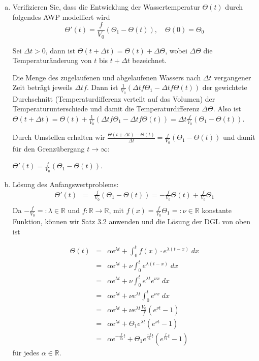 \documentclass[11pt,a4paper,ngerman]{article}
\begin{document}
\begin{enumerate}[a)]
\item Verifizieren Sie, dass die Entwicklung der Wassertemperatur $\Theta(t)$ durch folgendes AWP modelliert wird
$$ \Theta'(t) = \frac{f}{V_0}(\Theta_1 - \Theta(t)), \quad \Theta(0) = \Theta_0$$ 

Sei $\Delta t > 0$, dann ist $\Theta(t + \Delta t) = \Theta(t) + \Delta \Theta$, wobei $\Delta \Theta$ die Temperaturänderung von $t$ bis $t + \Delta t$ bezeichnet.

Die Menge des zugelaufenen und abgelaufenen Wassers nach $\Delta t$ vergangener Zeit beträgt jeweils $\Delta t f$. Dann ist $\frac{1}{V_0}(\Delta t f \Theta_1 - \Delta t f \Theta(t))$ der gewichtete Durchschnitt (Temperaturdifferenz verteilt auf das Volumen) der Temperaturunterschiede und damit die Temperaturdifferenz $\Delta \Theta$. Also ist $\Theta(t + \Delta t) = \Theta(t) + \frac{1}{V_0}(\Delta t f \Theta_1 - \Delta t f \Theta(t)) = \Delta t \frac{f}{V_0} (\Theta_1 - \Theta(t))$.

Durch Umstellen erhalten wir $\frac{\Theta(t + \Delta t) - \Theta(t)}{\Delta t} = \frac{f}{V_0} (\Theta_1 - \Theta(t))$ und damit für den Grenzübergang $t \to \infty$:

$\Theta'(t) = \frac{f}{V_0} (\Theta_1 - \Theta(t))$.

\item Lösung des Anfangswertproblems:
\begin{eqnarray*}
\Theta'(t) &=& \frac{f}{V_0} (\Theta_1 - \Theta(t)) = -\frac{f}{V_0} \Theta(t) + \frac{f}{V_0}\Theta_1 \\ 
\end{eqnarray*}
Da $-\frac{f}{V_0} =: \lambda \in \mathbb{R}$ und $f : \mathbb{R} \to \mathbb{R}$, mit $f(x)= \frac{f}{V_0}\Theta_1 =: \nu \in \mathbb{R}$ konstante Funktion, können wir Satz 3.2 anwenden und die Lösung der DGL von oben ist

\begin{eqnarray*}
\Theta(t) &=& \alpha e^{\lambda t} + \int_0^t f(x) \cdot e^{\lambda(t-x)} \; dx \\
&=& \alpha e^{\lambda t} + \nu \int_0^t e^{\lambda(t-x)} \; dx \\
&=& \alpha e^{\lambda t} + \nu \int_0^t  e^{\lambda t} e^{\nu x} \; dx \\
&=& \alpha e^{\lambda t} + \nu e^{\lambda t} \int_0^t  e^{\nu x} \; dx \\
&=& \alpha e^{\lambda t} + \nu e^{\lambda t} \frac{V_0}{f} (e^{\nu t} - 1) \\
&=& \alpha e^{\lambda t} + \Theta_1  e^{\lambda t} (e^{\nu t} - 1) \\
&=& \alpha e^{-\frac{f}{V_0} t} + \Theta_1  e^{\frac{-f}{V_0} t} (e^{\frac{f}{V_0} t} - 1) 
\end{eqnarray*}
für jedes $\alpha \in \mathbb{R}$.


\end{enumerate}
\end{document}
